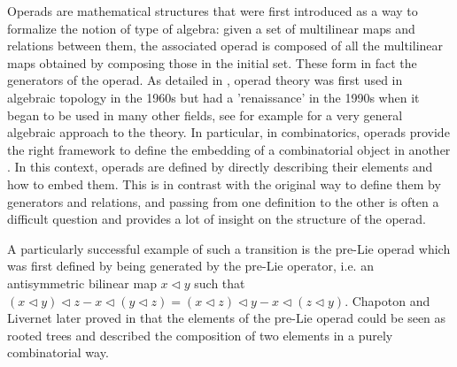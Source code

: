 \documentclass[11pt]{article}
\theoremstyle{definition}
\numberwithin{equation}{section}
\begin{document}
Operads are mathematical structures that were first introduced as a way to formalize the 
notion of type of algebra: given a set of multilinear maps and relations between them,
the associated operad is composed of all the multilinear maps obtained by composing those in the
initial set.
These form in fact the generators of the operad. As detailed in \cite{MSJ02}, operad theory was first 
used in algebraic topology in the 1960s but had a 'renaissance' in the 1990s when it began to be used 
in many other fields, see for example \cite{LV12} for a very general algebraic approach to the theory. 
In particular, in combinatorics, operads provide the right framework to define the embedding of a 
combinatorial object in another \cite{CSLC, Gir18}. In this context, operads are defined by directly 
describing their elements and how to embed them. This is in contrast with the original way to define
them by generators and relations, and passing from one definition to the other is often a difficult
question and provides a lot of insight on the structure of the operad. 

A particularly successful example of such a transition is the pre-Lie operad which was first defined by 
being generated by the pre-Lie operator, i.e. an antisymmetric bilinear map $x\vartriangleleft y$ such that 
$(x\vartriangleleft y)\vartriangleleft z -x \vartriangleleft(y\vartriangleleft z) = (x\vartriangleleft z)\vartriangleleft y - x\vartriangleleft(z\vartriangleleft y)$.
Chapoton and Livernet later proved in \cite{CL01} that the elements of the pre-Lie operad could be seen 
as rooted trees and described the composition of two elements in a purely combinatorial way.
\end{document}
